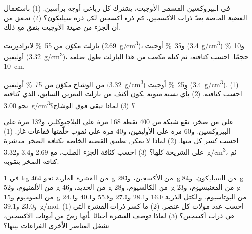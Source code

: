 \begin{exercise}[$\star\star$]\label{exo:g11:minerals:8}
في البيروكسين المسمى الأوجيت، يشترك كل رباعي أوجه برأسين. (1) باستعمال
القضية الخاصة بعدّ ذرات الأكسجين، كم ذرة أكسجين لكل
ذرة سيليكون؟ (2) تحقق من أن الجزء  من صيغة الأوجيت
يتفق مع ذلك.
\end{exercise}

\begin{exercise}[$\star\star$]\label{exo:g11:minerals:9}
بازلت مكوّن من \qty{55}{\percent} لابرادوريت (\qty{2.69}{g/cm^3})،
و\qty{35}{\percent} أوجيت (\qty{3.4}{g/cm^3}) و\qty{10}{\percent} أوليفين
(\qty{3.32}{g/cm^3})، حجمًا. احسب كثافته، ثم كتلة
مكعب من هذا البازلت طول ضلعه \qty{10}{cm}.
\end{exercise}

\begin{exercise}[$\star\star$]\label{exo:g11:minerals:10}
 من الوشاح مكوّن من \qty{75}{\percent} أوليفين
(\qty{3.32}{g/cm^3}) و\qty{25}{\percent} أوجيت (\qty{3.4}{g/cm^3}).
(1) احسب كثافته. (2) بأي نسبة مئوية يكون أكثف من
بازلت التمرين السابق، الذي كثافته نحو \qty{3.00}{g/cm^3}؟ (3) لماذا
تبقى  فوق الوشاح؟
\end{exercise}

\begin{exercise}[$\star\star$]\label{exo:g11:minerals:11}
على  من صخر، تقع شبكة من 400 نقطة 168 مرة على
البلاجيوكليز، و132 مرة على البيروكسين، و60 مرة على الأوليفين، و40 مرة على
ثقوب خلّفتها فقاعات غاز. (1) احسب كسر كل منها. (2) لماذا لا يمكن
تطبيق القضية الخاصة بكثافة الصخر مباشرة على الشريحة
كلها؟ (3) احسب كثافة الجزء الصلب، مع \qty{2.69}{}
و\qty{3.4}{} و\qty{3.32}{g/cm^3}، ثم كثافة الصخر بثقوبه.
\end{exercise}

\begin{exercise}[$\star\star\star$]\label{exo:g11:minerals:12}
في \qty{1}{kg} من القشرة القارية نحو \qty{464}{g} من الأكسجين،
و\qty{283}{g} من السيليكون، و\qty{84}{g} من الألمنيوم، و\qty{52}{g} من الحديد،
و\qty{46}{g} من الكالسيوم، و\qty{28}{g} من المغنيسيوم، و\qty{23}{g} من الصوديوم
و\qty{15}{g} من البوتاسيوم. والكتل الذرية \qty{16.0}{} و\qty{28.1}{}
و\qty{27.0}{} و\qty{55.8}{} و\qty{40.1}{} و\qty{24.3}{} و\qty{23.0}{}
و\qty{39.1}{g/mol}. (1) احسب عدد مولات كل عنصر. (2) ما
كسر ذرات القشرة التي هي ذرات أكسجين؟ (3) لماذا توصف القشرة
أحيانًا بأنها رصّ من أيونات الأكسجين، تشغل العناصر الأخرى
الفراغات بينها؟
\end{exercise}

